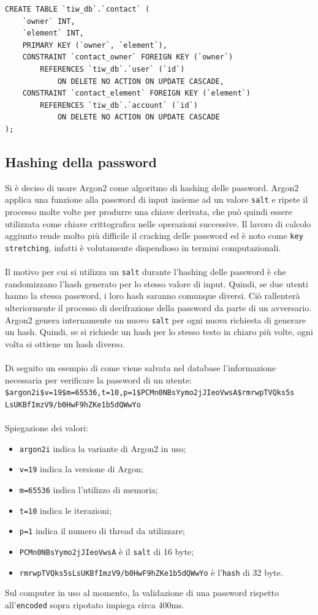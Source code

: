 \documentclass{article}
\begin{document}
\begin{verbatim}
CREATE TABLE `tiw_db`.`contact` (
	`owner` INT,
	`element` INT,
	PRIMARY KEY (`owner`, `element`),
	CONSTRAINT `contact_owner` FOREIGN KEY (`owner`) 
		REFERENCES `tiw_db`.`user` (`id`)
			ON DELETE NO ACTION ON UPDATE CASCADE,
	CONSTRAINT `contact_element` FOREIGN KEY (`element`) 
		REFERENCES `tiw_db`.`account` (`id`) 
			ON DELETE NO ACTION ON UPDATE CASCADE
);
\end{verbatim}

\subsection{Hashing della password}
Si è deciso di usare Argon2 come algoritmo di hashing delle password. Argon2 applica una funzione alla password di input insieme ad un valore \texttt{salt} e ripete il processo molte volte per produrre una chiave derivata, che può quindi essere utilizzata come chiave crittografica nelle operazioni successive. Il lavoro di calcolo aggiunto rende molto più difficile il cracking delle password ed è noto come \texttt{key stretching}, infatti è volutamente dispendioso in termini computazionali.
\\\\
Il motivo per cui si utilizza un \texttt{salt} durante l'hashing delle password è che randomizzano l'hash generato per lo stesso valore di input. Quindi, se due utenti hanno la stessa password, i loro hash saranno comunque diversi. Ciò rallenterà ulteriormente il processo di decifrazione della password da parte di un avversario.
\\
Argon2 genera internamente un nuovo \texttt{salt} per ogni nuova richiesta di generare un hash. Quindi, se si richiede un hash per lo stesso testo in chiaro più volte, ogni volta si ottiene un hash diverso. 
\\ \\
Di seguito un esempio di come viene salvata nel database l'informazione necessaria per verificare la password di un utente:\\ \texttt{\$argon2i\$v=19\$m=65536,t=10,p=1\$PCMn0NBsYymo2jJIeoVwsA\$rmrwpTVQks5s\\LsUKBfImzV9/b0HwF9hZKe1b5dQWwYo}
\\
\\
Spiegazione dei valori:
\begin{itemize}
\item \texttt{argon2i} indica la  variante di Argon2 in uso;
\item \texttt{v=19} indica la versione di Argon;
\item \texttt{m=65536} indica l'utilizzo di memoria;
\item \texttt{t=10} indica le iterazioni;
\item \texttt{p=1} indica il numero di thread da utilizzare;
\item \texttt{PCMn0NBsYymo2jJIeoVwsA} è il \texttt{salt} di 16 byte;
\item \texttt{rmrwpTVQks5sLsUKBfImzV9/b0HwF9hZKe1b5dQWwYo} è l'\texttt{hash} di 32 byte.
\end{itemize}
Sul computer in uso al momento, la validazione di una password rispetto all'\texttt{encoded} sopra ripotato impiega circa 400ms. 
\end{document}
